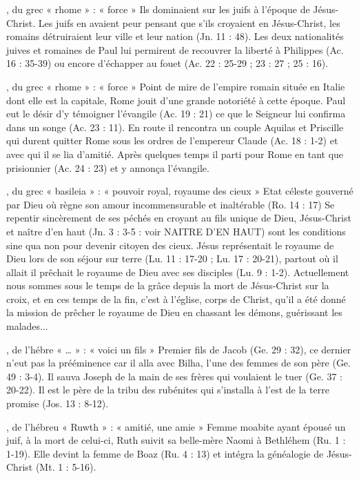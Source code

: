 \begin{multicols}{2}
, du grec « rhome » : « force »
Ils dominaient sur les juifs à l'époque de Jésus-Christ. Les juifs en avaient peur pensant que s'ils croyaient en Jésus-Christ, les romains détruiraient leur ville et leur nation (Jn. 11 : 48). Les deux nationalités juives et romaines de Paul lui permirent de recouvrer la liberté à Philippes (Ac. 16 : 35-39) ou encore d'échapper au fouet (Ac. 22 : 25-29 ; 23 : 27 ; 25 : 16).



, du grec « rhome » : « force »
Point de mire de l'empire romain située en Italie dont elle est la capitale, Rome jouit d'une grande notoriété à cette époque. Paul eut le désir d'y témoigner l'évangile (Ac. 19 : 21) ce que le Seigneur lui confirma dans un songe (Ac. 23 : 11). En route il rencontra un couple Aquilas et Priscille qui durent quitter Rome sous les ordres de l'empereur Claude (Ac. 18 : 1-2) et avec qui il se lia d'amitié. Après quelques temps il parti pour Rome en tant que prisionnier (Ac. 24 : 23) et y annonça l'évangile.



, du grec « basileia » : « pouvoir royal, royaume des cieux »
Etat céleste gouverné par Dieu où règne son amour incommensurable et inaltérable (Ro. 14 : 17) Se repentir sincèrement de ses péchés en croyant au fils unique de Dieu, Jésus-Christ et naître d'en haut (Jn. 3 : 3-5 : voir NAITRE D'EN HAUT) sont les conditions sine qua non pour devenir citoyen des cieux. Jésus représentait le royaume de Dieu lors de son séjour sur terre (Lu. 11 : 17-20 ; Lu. 17 : 20-21), partout où il allait il prêchait le royaume de Dieu avec ses disciples (Lu. 9 : 1-2). Actuellement nous sommes sous le temps de la grâce depuis la mort de Jésus-Christ sur la croix, et en ces temps de la fin, c'est à l'église, corps de Christ, qu'il a été donné la mission de prêcher le royaume de Dieu en chassant les démons, guérissant les malades...


, de l’hébre « … » : « voici un fils »
Premier fils de Jacob (Ge. 29 : 32), ce dernier n'eut pas la prééminence car il alla avec Bilha, l'une des femmes de son père (Ge. 49 : 3-4). Il sauva Joseph de la main de ses frères qui voulaient le tuer (Ge. 37 : 20-22). Il est le père de la tribu des rubénites qui s'installa à l'est de la terre promise (Jos. 13 : 8-12).


, de l'hébreu « Ruwth » : « amitié, une amie »
Femme moabite ayant épousé un juif, à la mort de celui-ci, Ruth suivit sa belle-mère Naomi à Bethléhem (Ru. 1 : 1-19). Elle devint la femme de Boaz (Ru. 4 : 13) et intégra la généalogie de Jésus-Christ (Mt. 1 : 5-16).



\end{multicols}
